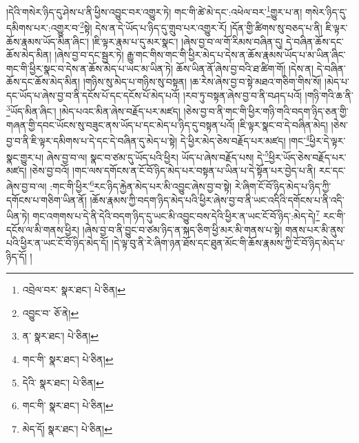 །དེའི་གསེར་ཉིད་དུ་ཤེས་པ་ནི་ཕྱིས་འབྱུང་བར་འགྱུར་ཏེ། གང་གི་ཚེ་མེ་དང་:འཕེལ་བར་\footnote{འབྲེལ་བར་  སྣར་ཐང་།  པེ་ཅིན། }གྱུར་པ་ན། གསེར་ཉིད་དུ་དམིགས་པར་:འགྱུར་བ་\footnote{འབྱུང་བ་  ཅོ་ནེ། }སྟེ། དེས་ན་དེ་ཡོད་པ་ཉིད་དུ་གྲུབ་པར་འགྱུར་རོ། །དོན་གྱི་ཚིགས་སུ་བཅད་པ་ནི། ཇི་ལྟར་ཆོས་རྣམས་ཡོད་མིན་ཞིང་། །ཇི་ལྟར་རྣམ་པ་དུ་མར་སྣང་། །ཞེས་བྱ་བ་ལ་གོ་རིམས་བཞིན་དུ། དེ་བཞིན་ཆོས་དང་ཆོས་མེད་མིན། །ཞེས་བྱ་བ་དང་སྦྱར་ཏེ། རྒྱུ་གང་གིས་གང་གི་ཕྱིར་མེད་པ་དེས་ན་ཆོས་རྣམས་ཡོད་པ་མ་ཡིན་ཞིང་གང་གི་ཕྱིར་སྣང་བ་དེས་ན་ཆོས་མེད་པ་ཡང་མ་ཡིན་ཏེ། ཆོས་ཡིན་ནོ་ཞེས་བྱ་བའི་ཐ་ཚིག་གོ། །དེས་ན། དེ་བཞིན་ཆོས་དང་ཆོས་མེད་མིན། །གཉིས་སུ་མེད་པ་གཉིས་སུ་བསྟན། །ཆ་རེས་ཞེས་བྱ་བ་སྟེ་མཐའ་གཅིག་གིས་སོ། །མེད་པ་དང་ཡོད་པ་ཞེས་བྱ་བ་ནི་དངོས་པོ་དང་དངོས་པོ་མེད་པའོ། །རབ་ཏུ་བསྟན་ཞེས་བྱ་བ་ནི་བཤད་པའོ། །གཉི་གའི་ཆ་ནི་\footnote{ན་  སྣར་ཐང་།  པེ་ཅིན། }ཡོད་མིན་ཞིང་། །མེད་པའང་མིན་ཞེས་བརྗོད་པར་མཛད། །ཅེས་བྱ་བ་ནི་གང་གི་ཕྱིར་གཉི་གའི་བདག་ཉིད་ཅན་གྱི་གཞན་གྱི་དབང་ཡོངས་སུ་བཟུང་ནས་ཡོད་པ་དང་མེད་པ་ཉིད་དུ་བསྟན་པའོ། །ཇི་ལྟར་སྣང་བ་དེ་བཞིན་མེད། །ཅེས་བྱ་བ་ནི་ཇི་ལྟར་དམིགས་པ་དེ་དང་དེ་བཞིན་དུ་མེད་པ་སྟེ། དེ་ཕྱིར་མེད་ཅེས་བརྗོད་པར་མཛད། །གང་\footnote{གང་གི་  སྣར་ཐང་།  པེ་ཅིན། }ཕྱིར་དེ་ལྟར་སྣང་གྱུར་པ། ཞེས་བྱ་བ་ལ། སྣང་བ་ཙམ་དུ་ཡོད་པའི་ཕྱིར། ཡོད་པ་ཞེས་བརྗོད་པས། དེ་\footnote{དེའི་  སྣར་ཐང་།  པེ་ཅིན། }ཕྱིར་ཡོད་ཅེས་བརྗོད་པར་མཛད། །ཅེས་བྱ་བའོ། །གང་ལས་དགོངས་ན་ངོ་བོ་ཉིད་མེད་པར་བསྟན་པ་ཡིན་པ་དེ་སྟོན་པར་བྱེད་པ་ནི། རང་དང་ཞེས་བྱ་བ་ལ། :གང་གི་ཕྱིར་\footnote{གང་གི་  སྣར་ཐང་།  པེ་ཅིན། }རང་ཉིད་རྐྱེན་མེད་པར་མི་འབྱུང་ཞེས་བྱ་བ་སྟེ། རེ་ཞིག་ངོ་བོ་ཉིད་མེད་པ་ཉིད་ཀྱི་དགོངས་པ་གཅིག་ཡིན་ནོ། །ཆོས་རྣམས་ཀྱི་བདག་ཉིད་མེད་པའི་ཕྱིར་ཞེས་བྱ་བ་ནི་ཡང་འདིའི་དགོངས་པ་ནི་འདི་ཡིན་ཏེ། གང་འགགས་པ་དེ་ནི་དེའི་བདག་ཉིད་དུ་ཡང་མི་འབྱུང་བས་དེའི་ཕྱིར་ན་ཡང་ངོ་བོ་ཉིད་:མེད་དེ།\footnote{མེད་དོ།  སྣར་ཐང་།  པེ་ཅིན། } རང་གི་དངོས་ལ་མི་གནས་ཕྱིར། །ཞེས་བྱ་བ་ནི་བྱུང་བ་ཙམ་ཉིད་ན་སྐད་ཅིག་ཕྱི་མར་མི་གནས་པ་སྟེ། གནས་པར་མི་ནུས་པའི་ཕྱིར་ན་ཡང་ངོ་བོ་ཉིད་མེད་དོ། །དེ་ལྟ་བུ་ནི་རེ་ཞིག་ཉན་ཐོས་དང་ཐུན་མོང་གི་ཆོས་རྣམས་ཀྱི་ངོ་བོ་ཉིད་མེད་པ་ཉིད་དོ། །
